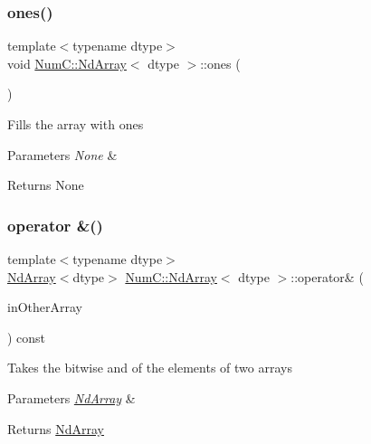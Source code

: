 \subsubsection{\texorpdfstring{ones()}{ones()}}
{\footnotesize\ttfamily template$<$typename dtype$>$ \\
void \mbox{\hyperlink{class_num_c_1_1_nd_array}{Num\+C\+::\+Nd\+Array}}$<$ dtype $>$\+::ones (\begin{DoxyParamCaption}{ }\end{DoxyParamCaption})\hspace{0.3cm}{\ttfamily [inline]}}

Fills the array with ones


\begin{DoxyParams}{Parameters}
{\em None} & \\
\hline
\end{DoxyParams}
\begin{DoxyReturn}{Returns}
None 
\end{DoxyReturn}
\mbox{\label{class_num_c_1_1_nd_array_a1e12ef0c840772a2d180cdf679b81297}} 
\subsubsection{\texorpdfstring{operator \&()}{operator \&()}\hspace{0.1cm}{\footnotesize\ttfamily [1/2]}}
{\footnotesize\ttfamily template$<$typename dtype$>$ \\
\mbox{\hyperlink{class_num_c_1_1_nd_array}{Nd\+Array}}$<$dtype$>$ \mbox{\hyperlink{class_num_c_1_1_nd_array}{Num\+C\+::\+Nd\+Array}}$<$ dtype $>$\+::operator\& (\begin{DoxyParamCaption}\item[{const \mbox{\hyperlink{class_num_c_1_1_nd_array}{Nd\+Array}}$<$ dtype $>$ \&}]{in\+Other\+Array }\end{DoxyParamCaption}) const\hspace{0.3cm}{\ttfamily [inline]}}

Takes the bitwise and of the elements of two arrays


\begin{DoxyParams}{Parameters}
{\em \mbox{\hyperlink{class_num_c_1_1_nd_array}{Nd\+Array}}} & \\
\hline
\end{DoxyParams}
\begin{DoxyReturn}{Returns}
\mbox{\hyperlink{class_num_c_1_1_nd_array}{Nd\+Array}} 
\end{DoxyReturn}
\mbox{\label{class_num_c_1_1_nd_array_ad45f32f0f838dd0eba65a867b7066b61}} 
